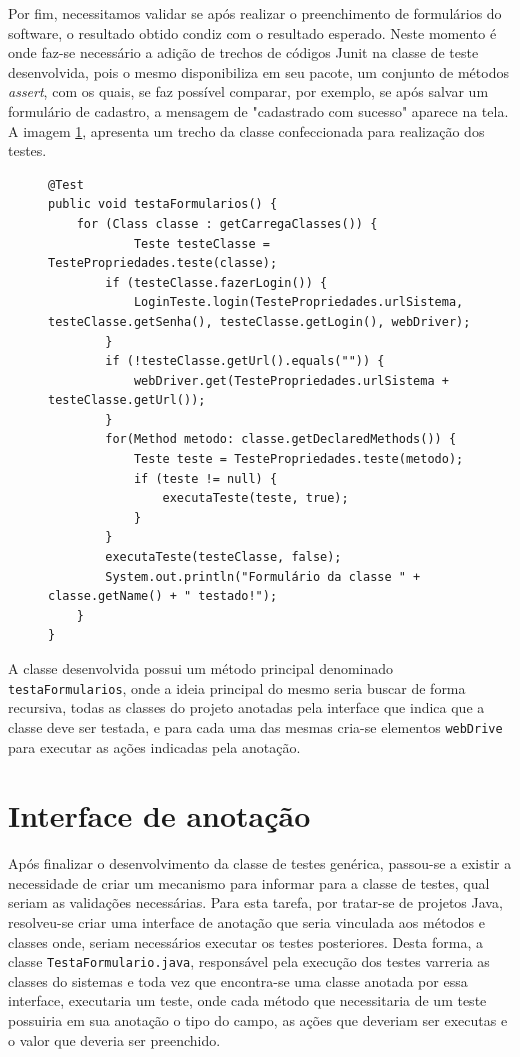 \documentclass[tg]{mdtufsm}
\begin{document}
Por fim, necessitamos validar se após realizar o preenchimento de formulários do software, o resultado obtido condiz com o resultado esperado. Neste momento é onde faz-se necessário a adição de trechos de códigos Junit na classe de teste
desenvolvida, pois o mesmo disponibiliza em seu pacote, um conjunto de métodos \emph{assert}, com os quais, se faz possível comparar, por exemplo, se após salvar um formulário de cadastro, a mensagem de "cadastrado com sucesso" aparece na tela.
A imagem \ref{code:TestaFormularios.java}, apresenta um trecho da classe confeccionada para realização dos testes.

\begin{figure}[!htb]
\begin{lstlisting}
@Test
public void testaFormularios() {
	for (Class classe : getCarregaClasses()) {
    		Teste testeClasse = TestePropriedades.teste(classe);
        if (testeClasse.fazerLogin()) {
            LoginTeste.login(TestePropriedades.urlSistema, testeClasse.getSenha(), testeClasse.getLogin(), webDriver);
        }
        if (!testeClasse.getUrl().equals("")) {
            webDriver.get(TestePropriedades.urlSistema + testeClasse.getUrl());
        }
        for(Method metodo: classe.getDeclaredMethods()) {
            Teste teste = TestePropriedades.teste(metodo);
            if (teste != null) {
                executaTeste(teste, true);
            }
        }
        executaTeste(testeClasse, false);
        System.out.println("Formulário da classe " + classe.getName() + " testado!");
	}
}
\end{lstlisting}
	\label{code:TestaFormularios.java}
\end{figure}

A classe desenvolvida possui um método principal denominado \texttt{testaFormularios}, onde a ideia principal do mesmo seria buscar
de forma recursiva, todas as classes do projeto anotadas pela interface que indica que a classe deve ser testada, e para cada uma das mesmas cria-se elementos \texttt{webDrive} para executar as ações indicadas pela anotação.

\section{Interface de anotação}

Após finalizar o desenvolvimento da classe de testes genérica, passou-se a existir a necessidade de criar um mecanismo para informar para a classe de testes, qual seriam as validações necessárias. Para esta tarefa,
por tratar-se de projetos Java, resolveu-se criar uma interface de anotação que seria vinculada aos métodos e classes onde, seriam necessários executar os testes posteriores. Desta forma, a classe \texttt{TestaFormulario.java},
responsável pela execução dos testes varreria as classes do sistemas e toda vez que encontra-se uma classe anotada por essa interface, executaria um teste, onde cada método que necessitaria de um teste possuiria em sua anotação o tipo do campo,
as ações que deveriam ser executas e o valor que deveria ser preenchido.
\end{document}
